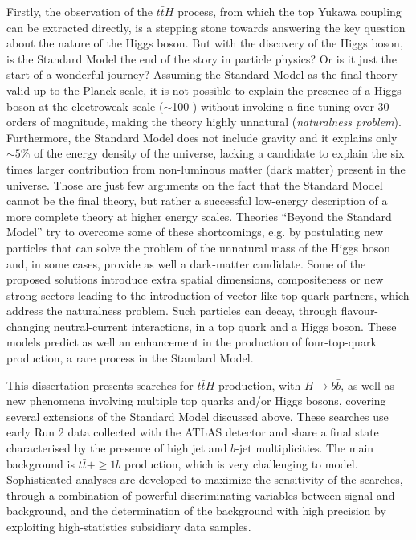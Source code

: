 Firstly, the observation of the $t\bar{t}H$ process, from which the top Yukawa coupling can be extracted directly, is a stepping stone towards answering the key question about the nature of the Higgs boson. But with the discovery of the Higgs boson, is the Standard Model the end of the story in particle physics? Or is it just the start of a wonderful journey? Assuming the Standard Model as the final theory valid up to the Planck scale, it is not possible to explain the presence of a Higgs boson at the electroweak scale ($\sim$100 \gev) without invoking a fine tuning over 30 orders of magnitude, making the theory highly unnatural (\emph{naturalness problem}). Furthermore, the Standard Model does not include gravity and it explains only $\sim5\%$ of the energy density of the universe, lacking a candidate to explain the six times larger contribution from non-luminous matter (dark matter) present in the universe. Those are just few arguments on the fact that the Standard Model cannot be the final theory, but rather a successful low-energy description of a more complete theory at higher energy scales. Theories ``Beyond the Standard Model'' try to overcome some of these shortcomings,  e.g. by postulating new particles that can solve the problem of the unnatural mass of the Higgs boson and, in some cases, provide as well a dark-matter candidate. Some of the proposed solutions introduce extra spatial dimensions, compositeness or new strong sectors leading to the introduction of vector-like top-quark partners, which address the naturalness problem. Such particles can decay, through flavour-changing neutral-current interactions, in a top quark and a Higgs boson. These models predict as well an enhancement in the production of four-top-quark production, a rare process in the Standard Model.\par
This dissertation presents searches for $t\bar{t}H$ production, with $H\to b\bar{b}$, as well as new phenomena involving multiple top quarks and/or Higgs bosons, covering several extensions of the Standard Model discussed above. These searches use early Run 2 data collected with the ATLAS detector and share a final state characterised by the presence of high jet and $b$-jet multiplicities. The main background is $t\bar{t}+\ge1b$ production, which is very challenging to model. Sophisticated analyses are developed to maximize the sensitivity of the searches, through a combination of powerful discriminating variables between signal and background, and the determination of the background with high precision by exploiting high-statistics subsidiary data samples.
